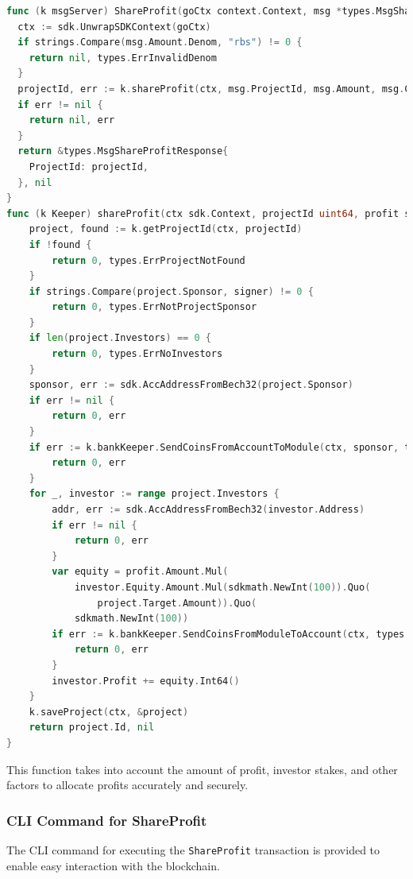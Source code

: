 \begin{lstlisting}[language=go, caption=Keeper implementation for ShareProfit, label={lst:keeper_share_profit}]
func (k msgServer) ShareProfit(goCtx context.Context, msg *types.MsgShareProfit) (*types.MsgShareProfitResponse, error) {
  ctx := sdk.UnwrapSDKContext(goCtx)
  if strings.Compare(msg.Amount.Denom, "rbs") != 0 {
    return nil, types.ErrInvalidDenom
  }
  projectId, err := k.shareProfit(ctx, msg.ProjectId, msg.Amount, msg.Creator)
  if err != nil {
    return nil, err
  }
  return &types.MsgShareProfitResponse{
    ProjectId: projectId,
  }, nil
}
func (k Keeper) shareProfit(ctx sdk.Context, projectId uint64, profit sdk.Coin, signer string) (uint64, error) {
	project, found := k.getProjectId(ctx, projectId)
	if !found {
		return 0, types.ErrProjectNotFound
	}
	if strings.Compare(project.Sponsor, signer) != 0 {
		return 0, types.ErrNotProjectSponsor
	}
	if len(project.Investors) == 0 {
		return 0, types.ErrNoInvestors
	}
	sponsor, err := sdk.AccAddressFromBech32(project.Sponsor)
	if err != nil {
		return 0, err
	}
	if err := k.bankKeeper.SendCoinsFromAccountToModule(ctx, sponsor, types.ModuleName, sdk.NewCoins(profit)); err != nil {
		return 0, err
	}
	for _, investor := range project.Investors {
		addr, err := sdk.AccAddressFromBech32(investor.Address)
		if err != nil {
			return 0, err
		}
		var equity = profit.Amount.Mul(
			investor.Equity.Amount.Mul(sdkmath.NewInt(100)).Quo(
				project.Target.Amount)).Quo(
			sdkmath.NewInt(100))
		if err := k.bankKeeper.SendCoinsFromModuleToAccount(ctx, types.ModuleName, addr, sdk.NewCoins(sdk.NewCoin("rbs", equity))); err != nil {
			return 0, err
		}
		investor.Profit += equity.Int64()
	}
	k.saveProject(ctx, &project)
	return project.Id, nil
}
\end{lstlisting}

This function takes into account the amount of profit, investor stakes, and other factors to allocate profits accurately and securely.

\subsubsection{CLI Command for ShareProfit}
\label{subsubsec:cli-share-profit}

The CLI command for executing the \texttt{ShareProfit} transaction is provided to enable easy interaction with the blockchain.

